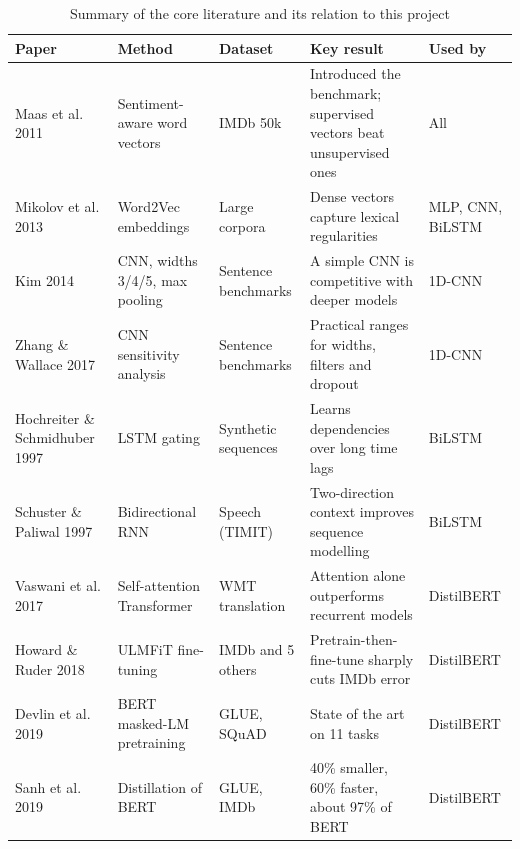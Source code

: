 \documentclass[conference,onecolumn,a4paper,10pt]{IEEEtran}
\begin{document}
\begin{table}[!t]
\caption{Summary of the core literature and its relation to this project}\label{tab:lit}
\centering\footnotesize\renewcommand{\arraystretch}{1.15}
\begin{tabularx}{\linewidth}{@{}L{3.0cm}L{3.1cm}L{2.2cm}YL{1.9cm}@{}}
\toprule
\textbf{Paper} & \textbf{Method} & \textbf{Dataset} & \textbf{Key result} & \textbf{Used by} \\
\midrule
Maas et al. 2011~\cite{maas2011} & Sentiment-aware word vectors & IMDb 50k & Introduced the benchmark; supervised vectors beat unsupervised ones & All \\
Mikolov et al. 2013~\cite{mikolov2013} & Word2Vec embeddings & Large corpora & Dense vectors capture lexical regularities & MLP, CNN, BiLSTM \\
Kim 2014~\cite{kim2014} & CNN, widths 3/4/5, max pooling & Sentence benchmarks & A simple CNN is competitive with deeper models & 1D-CNN \\
Zhang \& Wallace 2017~\cite{zhang2017} & CNN sensitivity analysis & Sentence benchmarks & Practical ranges for widths, filters and dropout & 1D-CNN \\
Hochreiter \& Schmidhuber 1997~\cite{hochreiter1997} & LSTM gating & Synthetic sequences & Learns dependencies over long time lags & BiLSTM \\
Schuster \& Paliwal 1997~\cite{schuster1997} & Bidirectional RNN & Speech (TIMIT) & Two-direction context improves sequence modelling & BiLSTM \\
Vaswani et al. 2017~\cite{vaswani2017} & Self-attention Transformer & WMT translation & Attention alone outperforms recurrent models & DistilBERT \\
Howard \& Ruder 2018~\cite{howard2018} & ULMFiT fine-tuning & IMDb and 5 others & Pretrain-then-fine-tune sharply cuts IMDb error & DistilBERT \\
Devlin et al. 2019~\cite{devlin2019} & BERT masked-LM pretraining & GLUE, SQuAD & State of the art on 11 tasks & DistilBERT \\
Sanh et al. 2019~\cite{sanh2019} & Distillation of BERT & GLUE, IMDb & 40\% smaller, 60\% faster, about 97\% of BERT & DistilBERT \\
\bottomrule
\end{tabularx}
\end{table}

\end{document}
